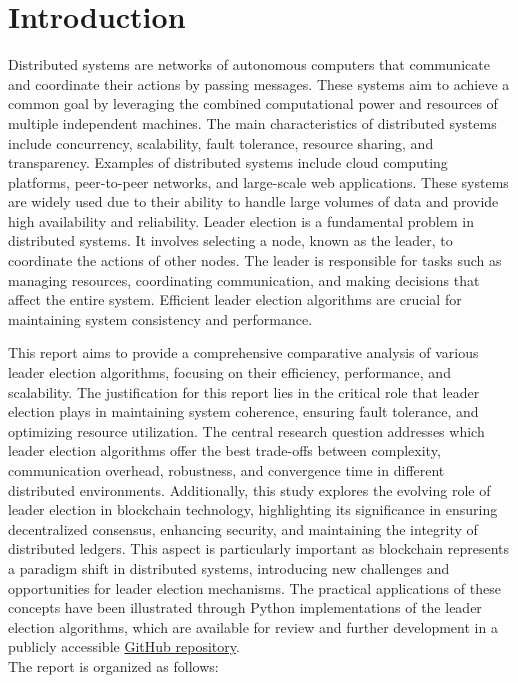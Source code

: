 \chapter{Introduction}

Distributed systems are networks of autonomous computers that communicate and coordinate their actions by passing messages. These systems aim to achieve a common goal by leveraging the combined computational power and resources of multiple independent machines. The main characteristics of distributed systems include concurrency, scalability, fault tolerance, resource sharing, and transparency. Examples of distributed systems include cloud computing platforms, peer-to-peer networks, and large-scale web applications. These systems are widely used due to their ability to handle large volumes of data and provide high availability and reliability.
Leader election is a fundamental problem in distributed systems. It involves selecting a node, known as the leader, to coordinate the actions of other nodes. The leader is responsible for tasks such as managing resources, coordinating communication, and making decisions that affect the entire system. Efficient leader election algorithms are crucial for maintaining system consistency and performance.

This report aims to provide a comprehensive comparative analysis of various leader election algorithms, focusing on their efficiency, performance, and scalability. The justification for this report lies in the critical role that leader election plays in maintaining system coherence, ensuring fault tolerance, and optimizing resource utilization. The central research question addresses which leader election algorithms offer the best trade-offs between complexity, communication overhead, robustness, and convergence time in different distributed environments.
Additionally, this study explores the evolving role of leader election in blockchain technology, highlighting its significance in ensuring decentralized consensus, enhancing security, and maintaining the integrity of distributed ledgers. This aspect is particularly important as blockchain represents a paradigm shift in distributed systems, introducing new challenges and opportunities for leader election mechanisms.
The practical applications of these concepts have been illustrated through Python implementations of the leader election algorithms, which are available for review and further development in a publicly accessible \href{https://github.com/giorgiosld/Distributed-System/tree/main}{GitHub repository}. \\
The report is organized as follows:

